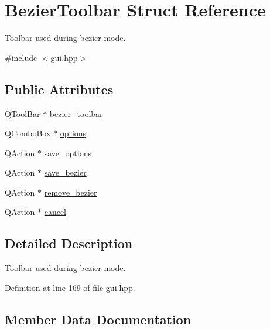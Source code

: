\hypertarget{structBezierToolbar}{}\section{Bezier\+Toolbar Struct Reference}
\label{structBezierToolbar}


Toolbar used during bezier mode.  




{\ttfamily \#include $<$gui.\+hpp$>$}

\subsection*{Public Attributes}
\begin{DoxyCompactItemize}
\item 
Q\+Tool\+Bar $\ast$ \mbox{\hyperlink{structBezierToolbar_a50604dd32265111bdef282bac1bd506c}{bezier\+\_\+toolbar}}
\item 
Q\+Combo\+Box $\ast$ \mbox{\hyperlink{structBezierToolbar_a84666bca25e5b6c194adaf0461c30ec3}{options}}
\item 
Q\+Action $\ast$ \mbox{\hyperlink{structBezierToolbar_a9d3e4ffe8c28b246dafd257110e28994}{save\+\_\+options}}
\item 
Q\+Action $\ast$ \mbox{\hyperlink{structBezierToolbar_a2848e3a1e3d0eb3dfe63959c12538782}{save\+\_\+bezier}}
\item 
Q\+Action $\ast$ \mbox{\hyperlink{structBezierToolbar_a1e1fd77e3baf09d382973b1ede4247cd}{remove\+\_\+bezier}}
\item 
Q\+Action $\ast$ \mbox{\hyperlink{structBezierToolbar_a5c91775ecfd6725f3707b5b838bcbbf9}{cancel}}
\end{DoxyCompactItemize}


\subsection{Detailed Description}
Toolbar used during bezier mode. 

Definition at line 169 of file gui.\+hpp.



\subsection{Member Data Documentation}
\mbox{\label{structBezierToolbar_a50604dd32265111bdef282bac1bd506c}} 
